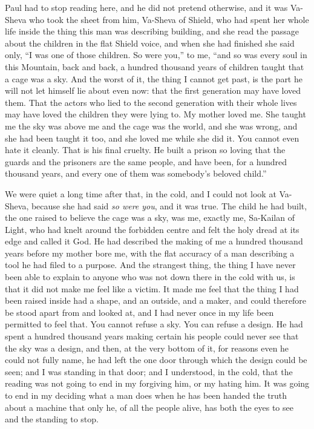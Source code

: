 Paul had to stop reading here, and he did not pretend otherwise, and it was Va-Sheva who took the sheet from him, Va-Sheva of Shield, who had spent her whole life inside the thing this man was describing building, and she read the passage about the children in the flat Shield voice, and when she had finished she said only, ``I was one of those children. So were you,'' to me, ``and so was every soul in this Mountain, back and back, a hundred thousand years of children taught that a cage was a sky. And the worst of it, the thing I cannot get past, is the part he will not let himself lie about even now: that the first generation may have loved them. That the actors who lied to the second generation with their whole lives may have loved the children they were lying to. My mother loved me. She taught me the sky was above me and the cage was the world, and she was wrong, and she had been taught it too, and she loved me while she did it. You cannot even hate it cleanly. That is his final cruelty. He built a prison so loving that the guards and the prisoners are the same people, and have been, for a hundred thousand years, and every one of them was somebody's beloved child.''\par

\ornament

We were quiet a long time after that, in the cold, and I could not look at Va-Sheva, because she had said \emph{so were you}, and it was true. The child he had built, the one raised to believe the cage was a sky, was me, exactly me, Sa-Kailan of Light, who had knelt around the forbidden centre and felt the holy dread at its edge and called it God. He had described the making of me a hundred thousand years before my mother bore me, with the flat accuracy of a man describing a tool he had filed to a purpose. And the strangest thing, the thing I have never been able to explain to anyone who was not down there in the cold with us, is that it did not make me feel like a victim. It made me feel that the thing I had been raised inside had a shape, and an outside, and a maker, and could therefore be stood apart from and looked at, and I had never once in my life been permitted to feel that. You cannot refuse a sky. You can refuse a design. He had spent a hundred thousand years making certain his people could never see that the sky was a design, and then, at the very bottom of it, for reasons even he could not fully name, he had left the one door through which the design could be seen; and I was standing in that door; and I understood, in the cold, that the reading was not going to end in my forgiving him, or my hating him. It was going to end in my deciding what a man does when he has been handed the truth about a machine that only he, of all the people alive, has both the eyes to see and the standing to stop.\par

